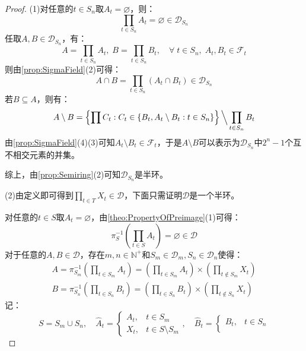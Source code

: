 \begin{proof}
	(1)对任意的$t\in S_n$取$A_t=\varnothing$，则：
	\begin{equation*}
		\prod_{t\in S_n}A_t=\varnothing\in\mathscr{D}_{S_n}
	\end{equation*}
	任取$A,B\in\mathscr{D}_{S_n}$，有：
	\begin{equation*}
		A=\prod_{t\in S_n}A_t,\;B=\prod_{t\in S_n}B_t,\quad\forall\;t\in S_n,\;A_t,B_t\in\mathscr{F}_t
	\end{equation*}
	则由\cref{prop:SigmaField}(2)可得：
	\begin{equation*}
		A\cap B=\prod_{t\in S_n}(A_t\cap B_t)\in\mathscr{D}_{S_n}
	\end{equation*}
	若$B\subseteq A$，则有：
	\begin{equation*}
		A\setminus B=\left\{\prod C_t:C_t\in\{B_t,A_t\setminus B_t:t\in S_n\}\right\}\Big\backslash\prod_{t\in S_n}B_t
	\end{equation*}
	由\cref{prop:SigmaField}(4)(3)可知$A_t\setminus B_t\in\mathscr{F}_t$，于是$A\setminus B$可以表示为$\mathscr{D}_{S_n}$中$2^n-1$个互不相交元素的并集。\par
	综上，由\cref{prop:Semiring}(2)可知$\mathscr{D}_{S_n}$是半环。\par
	(2)由定义即可得到$\prod\limits_{t\in T}X_t\in\mathscr{D}$，下面只需证明$\mathscr{D}$是一个半环。\par
	对任意的$t\in S$取$A_t=\varnothing$，由\cref{theo:PropertyOfPreimage}(1)可得：
	\begin{equation*}
		\pi_S^{-1}\left(\prod_{t\in S}A_t\right)=\varnothing\in\mathscr{D}
	\end{equation*}
	对于任意的$A,B\in\mathscr{D}$，存在$m,n\in\mathbb{N}^+$和$S_m\in\mathcal{D}_m,S_n\in\mathcal{D}_n$使得：
	\begin{gather*}
		A=\pi_{S_m}^{-1}\left(\prod_{t\in S_m}A_t\right)=\left(\prod_{t\in S_m}A_t\right)\times\left(\prod_{t\notin S_m}X_t\right) \\ B=\pi_{S_n}^{-1}\left(\prod_{t\in S_n}B_t\right)=\left(\prod_{t\in S_n}B_t\right)\times\left(\prod_{t\notin S_n}X_t\right)
	\end{gather*}
	记：
	\begin{equation*}
		S=S_m\cup S_n,\quad\hat{A}_t=
		\begin{cases}
			A_t,&t\in S_m \\
			X_t,&t\in S\setminus S_m
		\end{cases},\quad\hat{B}_t=
		\begin{cases}
			B_t,&t\in S_n \\

\end{cases}
\end{equation*}
\end{proof}
